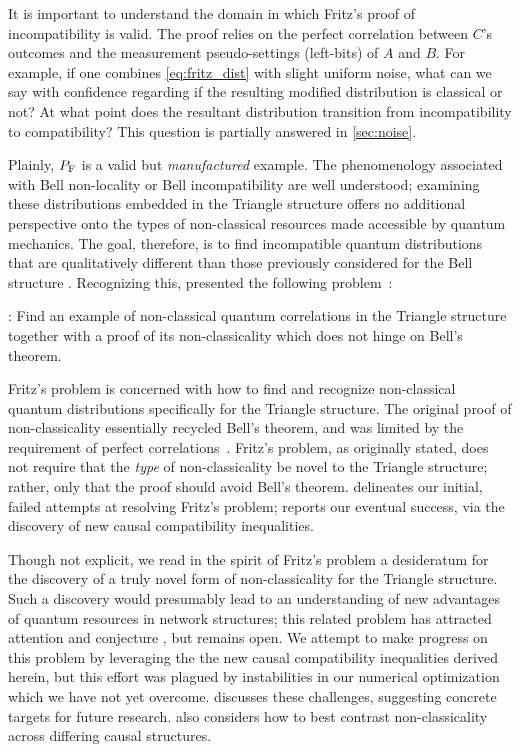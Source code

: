 \documentclass[aps, 10pt, english, twoside, pra, nofootinbib, tightenlines, longbibliography, superscriptaddress]{revtex4-1}
\begin{document}
    It is important to understand the domain in which Fritz's proof of incompatibility is valid.  %
    The proof relies on the perfect correlation between $C$'s outcomes and the measurement pseudo-settings (left-bits) of $A$ and $B$. For example, if one combines \cref{eq:fritz_dist} with slight uniform noise, what can we say with confidence regarding if the resulting modified distribution is classical or not? At what point does the resultant distribution transition from incompatibility to compatibility? This question is partially answered in \cref{sec:noise}.

    Plainly, $\prob[\fritz]$ is a valid but \textit{manufactured} example. The phenomenology associated with Bell non-locality or Bell incompatibility are well understood; examining these distributions embedded in the Triangle structure offers no additional perspective onto the types of non-classical resources made accessible by quantum mechanics. The goal, therefore, is to find incompatible quantum distributions that are qualitatively different than those previously considered for the Bell structure \cite{Gisin_2017}. Recognizing this, \citet{Fritz_2012} presented the following problem~\cite[Problem 2.17]{Fritz_2012}:

    : Find an example of non-classical quantum correlations in the Triangle structure together with a proof of its non-classicality which does not hinge on Bell’s theorem.

    Fritz's problem is concerned with how to find and recognize non-classical quantum distributions specifically for the Triangle structure. The original proof of non-classicality essentially recycled Bell's theorem, and was limited by the requirement of perfect correlations~\cite{Fritz_2012}. Fritz's problem, as originally stated, does not require that the \emph{type} of non-classicality be novel to the Triangle structure; rather, only that the proof should avoid Bell's theorem.  delineates our initial, failed attempts at resolving Fritz's problem;  reports our eventual success, via the discovery of new causal compatibility inequalities.

    Though not explicit, we read in the spirit of Fritz's problem a desideratum for the discovery of a truly novel form of non-classicality for the Triangle structure. Such a discovery would presumably lead to an understanding of new advantages of quantum resources in network structures; this related problem has attracted attention and conjecture \cite{Gisin_2017}, but remains open. We attempt to make progress on this problem by leveraging the the new causal compatibility inequalities derived herein, but this effort was plagued by instabilities in our numerical optimization which we have not yet overcome.  discusses these challenges, suggesting concrete targets for future research.  also considers how to best contrast non-classicality across differing causal structures.
\end{document}
